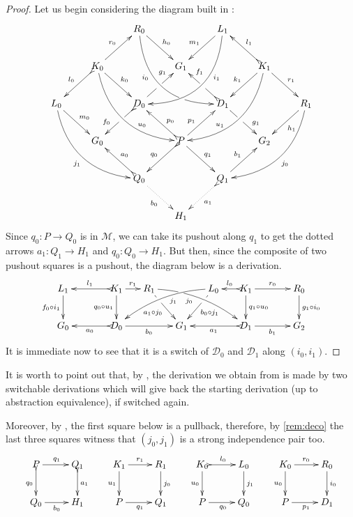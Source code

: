 \documentclass[a4paper,UKenglish,cleveref,pdftex, thm-restate,numberwithinsect,anonymous]{lipics}
\def\G{\textbf {\textup{G}}}
\newcommand{\dder}[1]{\mathscr{#1}}
\begin{document}
\thmChurch*
\label{thmChurch-proof}

\begin{proof}

  Let us begin considering the diagram
  built in :
  \[\xymatrix{&&R_0
      \ar@/_1cm/[ddrr]_(.35){i_0}|(.7)\hole \ar[dr]^{h_0}&&
      L_1\ar@/^1cm/[ddll]^(.35){i_1}
      \ar[dl]_{m_1}\\&K_0\ar[dr]^{k_0}\ar@{>->}[dl]_{l_0}
      \ar@/_.8cm/[ddrr]^(.65){u_0}\ar[ur]^{r_0}&& G_1 && K_1
      \ar@/^.8cm/[ddll]_(.65){u_1}\ar[dl]_{k_1}\ar@{>->}[lu]_{l_1}
      \ar[dr]^{r_1}\\L_0 \ar[dr]^{m_0} \ar@{>}@/_.8cm/[ddrr]_{j_1}&& D_0
      \ar@{>->}[dl]|(.42)\hole_(.64){f_0}\ar[ur]|(.48)\hole^(.7){g_1}&&D_1
      \ar[dr]|(.42)\hole^(.65){g_1}
      \ar@{>->}[ul]|(.48)\hole_(.7){f_1}&&R_1\ar@/^.8cm/[ddll]^{j_0}\ar[dl]^{h_1}\\&G_0
      &&P\ar[dr]^{q_1}
      \ar@{>->}[dl]_{q_0}\ar[ur]^(.4){p_1}\ar@{>->}[ul]_(.4){p_0}&&G_2\\&&Q_0
      \ar@{>->}@{>->}[ul]_{a_0} \ar@{.>}[dr]_{b_0} &&Q_1\ar[ur]^{b_1}
      \ar@{>.>}[dl]^{a_1} \\ &&&H_1 }\] Since $q_0\colon P\to Q_0$ is in
  $\mathcal{M}$, we can take its pushout along $q_1$ to get the dotted
  arrows $a_1\colon Q_1\to H_1$ and $q_0\colon Q_0\to H_1$. But then,
  since the composite of two pushout squares is a pushout, the diagram
  below is a derivation.
  \[\xymatrix@C=15pt{L_1 \ar[d]_{f_0 \circ i_1}&& K_1
      \ar[d]_{q_0\circ u_1}\ar@{>->}[ll]_{l_1} \ar[r]^{r_1} & R_1
      \ar@/^.35cm/[drrr]|(.3)\hole_(.4){j_0} \ar[dr]|(.3)\hole_{a_1\circ
        j_0} && L_0 \ar@/_.35cm/[dlll]^(.4){j_1} \ar[dl]|(.3)\hole^{b_0\circ
        j_1}& K_1 \ar[d]^{q_1\circ u_0}\ar@{>->}[l]_{l_0} \ar[rr]^{r_0} && R_0
      \ar[d]^{g_1\circ i_0} \\G_0 && \ar@{>->}[ll]^{a_0} D_0 \ar[rr]_{b_0}&&
      G_1 && \ar@{>->}[ll]^{a_1} D_1 \ar[rr]_{b_1}&& G_2}\] It is immediate
  now to see that it is a switch of $\dder{D}_0$ and $\dder{D}_1$ along
  $(i_0, i_1)$.
\end{proof}

\begin{remark}
	\label{rem:church}
	It is worth to point out that, by
	, the derivation we obtain from
	 is made by two switchable derivations which will
	give back the starting derivation (up to abstraction equivalence),
	if switched again.
	
	Moreover, by , the first square below is a
	pullback, therefore, by \cref{rem:deco} the last three squares
	witness that $(j_0, j_1)$ is a strong independence pair too.
	\[
	\xymatrix{P\ar[r]^{q_1} \ar@{>->}[d]_{q_0}&Q_1
		\ar@{>->}[d]^{a_1}&K_1 \ar[r]^{r_1} \ar[d]_{u_1}& R_1
		\ar[d]^{j_0} & K_0 \ar@{>->}[r]^{l_0} \ar[d]_{u_0}& L_0
		\ar[d]^{j_1}&K_0 \ar[r]^{r_0} \ar[d]_{u_0}& R_0\ar[d]^{i_0} \\
		Q_ 0\ar[r]_{b_0}&H_1&P \ar[r]_{q_1} & Q_1 &P \ar[r]_{q_0} &
		Q_0&P \ar[r]_{p_1} & D_1}
	\]
\end{remark}
\end{document}

